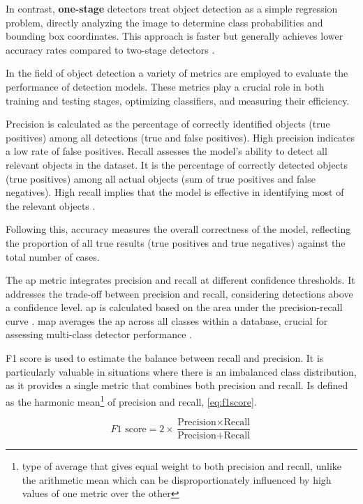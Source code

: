 In contrast, \textbf{one-stage} detectors treat object detection as a simple regression problem, directly analyzing the image to determine class probabilities and bounding box coordinates. This approach is faster but generally achieves lower accuracy rates compared to two-stage detectors \cite{rfc23}.

In the field of object detection a variety of metrics are employed to evaluate the performance of detection models. These metrics play a crucial role in both training and testing stages, optimizing classifiers, and measuring their efficiency. 

Precision is calculated as the percentage of correctly identified objects (true positives) among all detections (true and false positives). High precision indicates a low rate of false positives. Recall assesses the model's ability to detect all relevant objects in the dataset. It is the percentage of correctly detected objects (true positives) among all actual objects (sum of true positives and false negatives). High recall implies that the model is effective in identifying most of the relevant objects \cite{rfc25}.

Following this, accuracy measures the overall correctness of the model, reflecting the proportion of all true results (true positives and true negatives) against the total number of cases.

The \ac{ap} metric integrates precision and recall at different confidence thresholds. It addresses the trade-off between precision and recall, considering detections above a confidence level. \ac{ap} is calculated based on the area under the precision-recall curve \cite{rfc25}. \ac{map} averages the \ac{ap} across all classes within a database, crucial for assessing multi-class detector performance \cite{rfc24}. 

F1 score is used to estimate the balance between recall and precision. It is particularly valuable in situations where there is an imbalanced class distribution, as it provides a single metric that combines both precision and recall. Is defined as the harmonic mean\footnote{type of average that gives equal weight to both precision and recall, unlike the arithmetic mean which can be disproportionately influenced by high values of one metric over the other} of precision and recall, \ref{eq:f1score}. 

\begin{equation}
    F1 \text{ score} = 2 \times \frac{\text{Precision} \times \text{Recall}}{\text{Precision} + \text{Recall}}
    \label{eq:f1score}
\end{equation}
    
